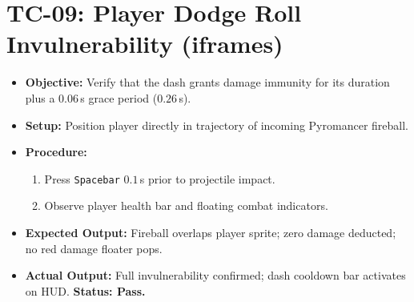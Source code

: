 \section{TC-09: Player Dodge Roll Invulnerability (iframes)}
\begin{itemize}
    \item \textbf{Objective:} Verify that the dash grants damage immunity for its duration plus a $0.06$\,s grace period ($0.26$\,s).
    \item \textbf{Setup:} Position player directly in trajectory of incoming Pyromancer fireball.
    \item \textbf{Procedure:}
    \begin{enumerate}
        \item Press \texttt{Spacebar} $0.1$\,s prior to projectile impact.
        \item Observe player health bar and floating combat indicators.
    \end{enumerate}
    \item \textbf{Expected Output:} Fireball overlaps player sprite; zero damage deducted; no red damage floater pops.
    \item \textbf{Actual Output:} Full invulnerability confirmed; dash cooldown bar activates on HUD. \textbf{Status: Pass.}
\end{itemize}

